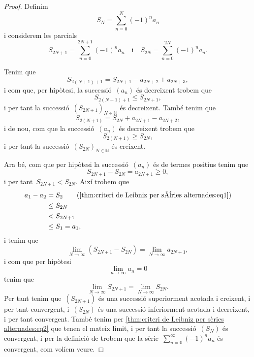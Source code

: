 \documentclass[../../main.tex]{subfiles}
\begin{document}
    \begin{proof}
        Definim
        \begin{equation}
            \label{thm:criteri de Leibniz per sèries alternades:eq1}
            S_{N}=\sum_{n=0}^{N}(-1)^{n}a_{n}
        \end{equation}
        i considerem les parcials
        \[
            S_{2N+1}=\sum_{n=0}^{2N+1}(-1)^{n}a_{n}\quad\text{i}\quad S_{2N}=\sum_{n=0}^{2N}(-1)^{n}a_{n}.
        \]

        Tenim que
        \[
            S_{2(N+1)+1}=S_{2N+1}-a_{2N+2}+a_{2N+3},
        \]
        i com que, per hipòtesi, la successió~\((a_{n})\) és decreixent trobem que
        \[
            S_{2(N+1)+1}\leq S_{2N+1},
        \]
        i per tant la successió~\((S_{2N+1})_{N\in\mathbb{N}}\) és decreixent.
        També tenim que
        \[
            S_{2(N+1)}=S_{2N}+a_{2N+1}-a_{2N+2},
        \]
        i de nou, com que la successió~\((a_{n})\) és decreixent trobem que
        \[
            S_{2(N+1)}\geq S_{2N},
        \]
        i per tant la successió~\((S_{2N})_{N\in\mathbb{N}}\) és creixent.

        Ara bé, com que per hipòtesi la successió~\((a_{n})\) és de termes positius tenim que
        \[
            S_{2N+1}-S_{2N}=a_{2N+1}\geq0,
        \]
        i per tant~\(S_{2N+1}<S_{2N}\).
        Així trobem que
        \begin{align*}
            a_{1}-a_{2}&=S_{2} \tag{\ref{thm:criteri de Leibniz per sèries alternades:eq1}} \\
            &\leq S_{2N} \\
            &< S_{2N+1} \\
            &\leq S_{1}=a_{1},
        \end{align*}
        i tenim que
        \[
            \lim_{N\to\infty}\left(S_{2N+1}-S_{2N}\right)=\lim_{N\to\infty}a_{2N+1},
        \]
        i com que per hipòtesi
        \[
            \lim_{n\to\infty}a_{n}=0
        \]
        tenim que
        \begin{equation}
            \label{thm:criteri de Leibniz per sèries alternades:eq2}
            \lim_{N\to\infty}S_{2N+1}=\lim_{N\to\infty}S_{2N}.
        \end{equation}
        Per tant tenim que~\((S_{2N+1})\) és una successió superiorment acotada i creixent, i per tant convergent, i~\((S_{2N})\) és una successió inferiorment acotada i decreixent, i per tant convergent.
        També tenim per \eqref{thm:criteri de Leibniz per sèries alternades:eq2} que tenen el mateix límit, i per tant la successió~\((S_{N})\) és convergent, i per la definició de  trobem que la sèrie~\(\sum_{n=0}^{\infty}(-1)^{n}a_{n}\) és convergent, com volíem veure.
    \end{proof}
\end{document}
